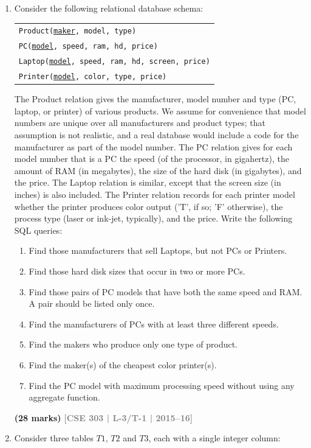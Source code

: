 \documentclass[12pt]{article}
\newcommand{\yr}[1]{\hfill\textcolor{gray}{\small\textbf{[#1]}}}
\newcommand{\mk}[1]{\textcolor{orange!70!black}{\small\textbf{(#1 marks)}}}
\begin{document}
\begin{enumerate}
\item Consider the following relational database schema:
\begin{center}
\begin{tabular}{l}
\texttt{Product(\underline{maker}, model, type)}\\
\texttt{PC(\underline{model}, speed, ram, hd, price)}\\
\texttt{Laptop(\underline{model}, speed, ram, hd, screen, price)}\\
\texttt{Printer(\underline{model}, color, type, price)}
\end{tabular}
\end{center}
The Product relation gives the manufacturer, model number and type (PC, laptop, or
printer) of various products. We assume for convenience that model numbers are
unique over all manufacturers and product types; that assumption is not realistic, and a
real database would include a code for the manufacturer as part of the model number.
The PC relation gives for each model number that is a PC the speed (of the processor,
in gigahertz), the amount of RAM (in megabytes), the size of the hard disk (in
gigabytes), and the price. The Laptop relation is similar, except that the screen size (in
inches) is also included. The Printer relation records for each printer model whether
the printer produces color output ('T', if so; 'F' otherwise), the process type (laser or
ink-jet, typically), and the price.
Write the following SQL queries:
\begin{enumerate}
  \item Find those manufacturers that sell Laptops, but not PCs or Printers.
  \item Find those hard disk sizes that occur in two or more PCs.
  \item Find those pairs of PC models that have both the same speed and RAM. A pair should be listed only once.
  \item Find the manufacturers of PCs with at least three different speeds.
  \item Find the makers who produce only one type of product.
  \item Find the maker(s) of the cheapest color printer(s).
  \item Find the PC model with maximum processing speed without using any aggregate function.
\end{enumerate}
\mk{28} \yr{CSE 303 | L-3/T-1 | 2015--16}


\item Consider three tables $T1$, $T2$ and $T3$, each with a single integer column:


\end{enumerate}
\end{document}
